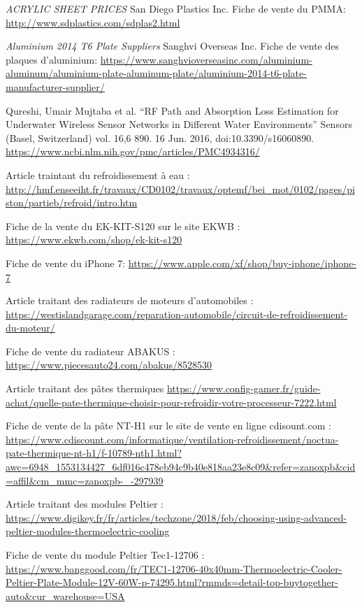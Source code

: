 \begin{thebibliographyUL}{9}
 \emph{ACRYLIC SHEET PRICES} San Diego Plastics Inc. Fiche de vente du PMMA: \url{http://www.sdplastics.com/sdplas2.html}


 \emph{Aluminium 2014 T6 Plate Suppliers} Sanghvi Overseas Inc. Fiche de vente des plaques d'aluminium: \url{https://www.sanghvioverseasinc.com/aluminium-aluminum/aluminium-plate-aluminum-plate/aluminium-2014-t6-plate-manufacturer-supplier/}

 Qureshi, Umair Mujtaba et al. “RF Path and Absorption Loss Estimation for Underwater Wireless Sensor Networks in Different Water Environments” Sensors (Basel, Switzerland) vol. 16,6 890. 16 Jun. 2016, doi:10.3390/s16060890.  \url{https://www.ncbi.nlm.nih.gov/pmc/articles/PMC4934316/}

 Article traintant du refroidissement à eau :
\url{http://hmf.enseeiht.fr/travaux/CD0102/travaux/optemf/bei_mot/0102/pages/piston/partieb/refroid/intro.htm}

 Fiche de la vente du EK-KIT-S120 sur le site EKWB :
\url{https://www.ekwb.com/shop/ek-kit-s120}

 Fiche de vente du iPhone 7: \url{https://www.apple.com/xf/shop/buy-iphone/iphone-7}

 Article traitant des radiateurs de moteurs d'automobiles :
\url{https://westislandgarage.com/reparation-automobile/circuit-de-refroidissement-du-moteur/}

 Fiche de vente du radiateur ABAKUS :
\url{https://www.piecesauto24.com/abakus/8528530}

 Article traitant des pâtes thermiques
\url{https://www.config-gamer.fr/guide-achat/quelle-pate-thermique-choisir-pour-refroidir-votre-processeur-7222.html}

 Fiche de vente de la pâte NT-H1 sur le site de vente en ligne cdisount.com :
\url{https://www.cdiscount.com/informatique/ventilation-refroidissement/noctua-pate-thermique-nt-h1/f-10789-nth1.html?awc=6948_1553134427_6df016c478eb94c9b40e818aa23e8c09&refer=zanoxpb&cid=affil&cm_mmc=zanoxpb-_-297939}

 Article traitant des modules Peltier :
\url{https://www.digikey.fr/fr/articles/techzone/2018/feb/choosing-using-advanced-peltier-modules-thermoelectric-cooling}

 Fiche de vente du module Peltier Tec1-12706 :
\url{https://www.banggood.com/fr/TEC1-12706-40x40mm-Thermoelectric-Cooler-Peltier-Plate-Module-12V-60W-p-74295.html?rmmds=detail-top-buytogether-auto&cur_warehouse=USA}


\end{thebibliographyUL}
